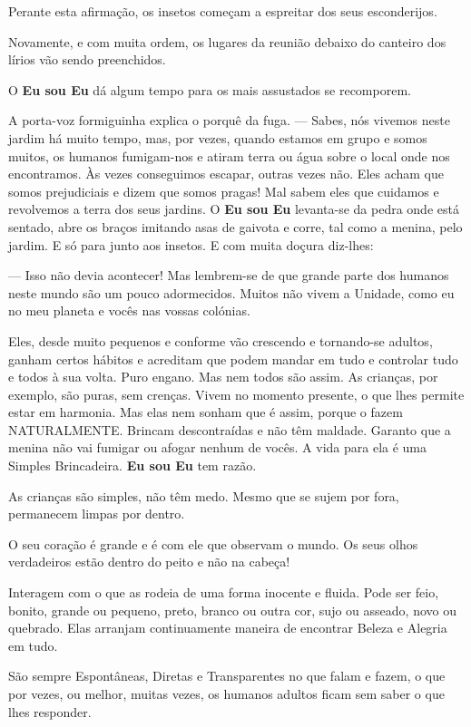 Perante esta afirmação, os insetos começam a espreitar dos seus esconderijos.

Novamente, e com muita ordem, os lugares da reunião debaixo do canteiro dos lírios vão sendo preenchidos.

O \textbf{Eu sou Eu} dá algum tempo para os mais assustados se recomporem.

A porta-voz formiguinha explica o porquê da fuga.
\bigbreak
— Sabes, nós vivemos neste jardim há muito tempo, mas, por vezes, quando estamos em grupo e somos muitos, os humanos fumigam-nos e atiram terra ou água sobre o local onde nos encontramos. Às vezes conseguimos escapar, outras vezes não. Eles acham que somos prejudiciais e dizem que somos pragas! Mal sabem eles que cuidamos e revolvemos a terra dos seus jardins.
\bigbreak
O \textbf{Eu sou Eu} levanta-se da pedra onde está sentado, abre os braços imitando asas de gaivota e corre, tal como a menina, pelo jardim. E só para junto aos insetos. E com muita doçura diz-lhes:

— Isso não devia acontecer! Mas lembrem-se de que grande parte dos humanos neste mundo são um pouco adormecidos. Muitos não vivem a Unidade, como eu no meu planeta e vocês nas vossas colónias.

Eles, desde muito pequenos e conforme vão crescendo e tornando-se adultos, ganham certos hábitos e acreditam que podem mandar em tudo e controlar tudo e todos à sua volta. Puro engano. Mas nem todos são assim. As crianças, por exemplo, são puras, sem crenças. Vivem no momento presente, o que lhes permite estar em harmonia. Mas elas nem sonham que é assim, porque o fazem NATURALMENTE. Brincam descontraídas e não têm maldade. Garanto que a menina não vai fumigar ou afogar nenhum de vocês. A vida para ela é uma Simples Brincadeira.
\bigbreak
\textbf{Eu sou Eu} tem razão.

As crianças são simples, não têm medo. Mesmo que se sujem por fora, permanecem limpas por dentro.

O seu coração é grande e é com ele que observam o mundo. Os seus olhos verdadeiros estão dentro do peito e não na cabeça!

Interagem com o que as rodeia de uma forma inocente e fluida. Pode ser feio, bonito, grande ou pequeno, preto, branco ou outra cor, sujo ou asseado, novo ou quebrado. Elas arranjam continuamente maneira de encontrar Beleza e Alegria em tudo.

São sempre Espontâneas, Diretas e Transparentes no que falam e fazem, o que por vezes, ou melhor, muitas vezes, os humanos adultos ficam sem saber o que lhes responder.

